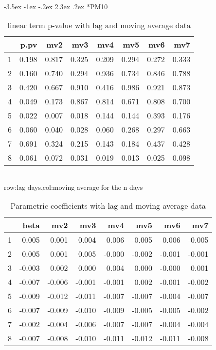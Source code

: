\documentclass[a4paper, 12pt]{article}
\makeatletter
\def\large{\fontsize{14}{20}\selectfont}
\renewcommand\subsection{\@startsection {subsection}{1}{\z@}%
                                   {-3.5ex \@plus -1ex \@minus -.2ex}%
                                   {2.3ex \@plus.2ex}%
                                   {\centering\normalfont\large\bfseries}}
\makeatother
\begin{document}
\subsection*{PM10}
\begin{table}[h]
\centering
\caption{linear term p-value with lag and moving average data}
\begin{tabular}{rrrrrrrr}
  \hline
 & p.pv & mv2 & mv3 & mv4 & mv5 & mv6 & mv7 \\
  \hline
1 & 0.198 & 0.817 & 0.325 & 0.209 & 0.294 & 0.272 & 0.333 \\
  2 & 0.160 & 0.740 & 0.294 & 0.936 & 0.734 & 0.846 & 0.788 \\
  3 & 0.420 & 0.667 & 0.910 & 0.416 & 0.986 & 0.921 & 0.873 \\
  4 & 0.049 & 0.173 & 0.867 & 0.814 & 0.671 & 0.808 & 0.700 \\
  5 & 0.022 & 0.007 & 0.018 & 0.144 & 0.144 & 0.393 & 0.176 \\
  6 & 0.060 & 0.040 & 0.028 & 0.060 & 0.268 & 0.297 & 0.663 \\
  7 & 0.691 & 0.324 & 0.215 & 0.143 & 0.184 & 0.437 & 0.428 \\
  8 & 0.061 & 0.072 & 0.031 & 0.019 & 0.013 & 0.025 & 0.098 \\
   \hline
\end{tabular}
\\row:lag days,col:moving average for the n days
\end{table}

\begin{table}[h]
\centering
\caption{Parametric coefficients with lag and moving average data}
\begin{tabular}{rrrrrrrr}
  \hline
 & beta & mv2 & mv3 & mv4 & mv5 & mv6 & mv7 \\
  \hline
1 & -0.005 & 0.001 & -0.004 & -0.006 & -0.005 & -0.006 & -0.005 \\
  2 & 0.005 & 0.001 & 0.005 & -0.000 & -0.002 & -0.001 & -0.001 \\
  3 & -0.003 & 0.002 & 0.000 & 0.004 & 0.000 & -0.000 & 0.001 \\
  4 & -0.007 & -0.006 & -0.001 & -0.001 & 0.002 & -0.001 & -0.002 \\
  5 & -0.009 & -0.012 & -0.011 & -0.007 & -0.007 & -0.004 & -0.007 \\
  6 & -0.007 & -0.009 & -0.010 & -0.009 & -0.005 & -0.005 & -0.002 \\
  7 & -0.002 & -0.004 & -0.006 & -0.007 & -0.007 & -0.004 & -0.004 \\
  8 & -0.007 & -0.008 & -0.010 & -0.011 & -0.012 & -0.011 & -0.008 \\
   \hline
\end{tabular}
\end{table}
\clearpage
\end{document}
